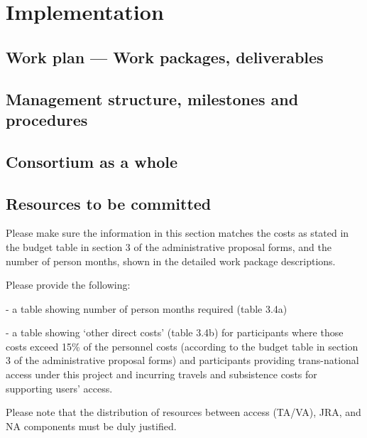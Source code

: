 \chapter{Implementation}\label{chap:implementation}

\section{Work plan --- Work packages, deliverables}



\section{Management structure, milestones and procedures}



\section{Consortium as a whole}\label{sec:consortium}



\section{Resources to be committed}\label{sec:resources}

\begin{todo}{}\color{red}
Please make sure the information in this section matches the costs as stated in the budget table in section 3 of the administrative proposal forms, and the number of person months, shown in the detailed work package descriptions.

Please provide the following:

- a table showing number of person months required (table 3.4a)

- a table showing ‘other direct costs’ (table 3.4b) for participants where those  costs exceed 15\% of the personnel costs (according to the budget  table in section 3 of the administrative proposal forms) and participants providing trans-national access under this project and incurring travels and subsistence costs for supporting users' access.

Please note that the distribution of resources between access (TA/VA), JRA, and NA components must be duly justified.
\end{todo}

